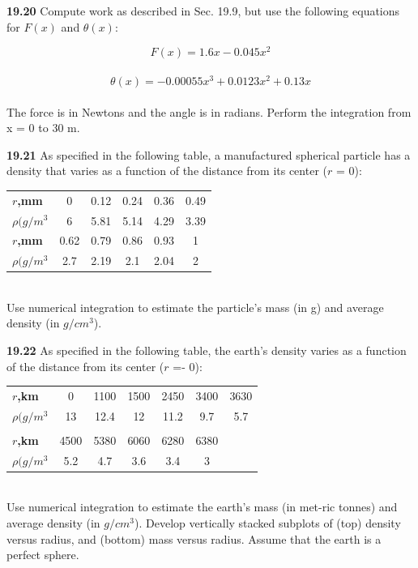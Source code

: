 \documentclass[../main.tex]{subfiles}
\begin{document}
\begin{multicols}{2}
\textbf{19.20} Compute work as described in Sec. 19.9, but use the
following equations for $F(x)$ and $\theta(x)$:

	$$F(x)=1.6x-0.045x^{2}$$\\
	$$\theta(x)=-0.00055x^{3} + 0.0123x^{2} + 0.13x$$\\
The force is in Newtons and the angle is in radians. Perform
the integration from x = 0 to 30 m.

\textbf{19.21} As specified in the following table, a manufactured
spherical particle has a density that varies as a function of the
distance from its center ($r$ = 0):\\
\begin{tabular}{lccccc}
	\hline
	\scriptsize{\textbf{$r$,mm}} & \scriptsize{0} & \scriptsize{0.12} & \scriptsize{0.24} & \scriptsize{0.36} & \scriptsize{0.49}\\
	\scriptsize{\textbf{$\rho(g/m^{3}$}} & \scriptsize{6} & \scriptsize{5.81} & \scriptsize{5.14} & \scriptsize{4.29} & \scriptsize{3.39}
	\vspace{0in}\\
	\scriptsize{\textbf{$r$,mm}} & \scriptsize{0.62} & \scriptsize{0.79} & \scriptsize{0.86} & \scriptsize{0.93} & \scriptsize{1}\\
	\scriptsize{\textbf{$\rho(g/m^{3}$}} & \scriptsize{2.7} & \scriptsize{2.19} & \scriptsize{2.1} & \scriptsize{2.04} & \scriptsize{2}\\ 	\hline
\end{tabular}
\vspace{0.2in}\\
Use numerical integration to estimate the particle's mass
(in g) and average density (in $g/cm^3$).

\textbf{19.22} As specified in the following table, the earth's density
varies as a function of the distance from its center ($r$ =- 0):\\
\begin{tabular}{lcccccc}
	\hline
	\scriptsize{\textbf{$r$,km}} & \scriptsize{0} & \scriptsize{1100} & \scriptsize{1500} & \scriptsize{2450} & \scriptsize{3400} & \scriptsize{3630}\\
	\scriptsize{\textbf{$\rho(g/m^{3}$}} & \scriptsize{13} & \scriptsize{12.4} & \scriptsize{12} & \scriptsize{11.2} & \scriptsize{9.7} & \scriptsize{5.7}\\
	\vspace{0in}\\
	\scriptsize{\textbf{$r$,km}} & \scriptsize{4500} & \scriptsize{5380} & \scriptsize{6060} & \scriptsize{6280} & \scriptsize{6380}\\
	\scriptsize{\textbf{$\rho(g/m^{3}$}} & \scriptsize{5.2} & \scriptsize{4.7} & \scriptsize{3.6} & \scriptsize{3.4} & \scriptsize{3}\\
	\hline
\end{tabular}
\vspace{0.2in}\\
Use numerical integration to estimate the earth's mass (in met-ric tonnes) and average density (in $g/cm^3$). Develop vertically stacked subplots of (top) density versus radius, and (bottom) mass versus radius. Assume that the earth is a perfect sphere.
	



\end{multicols}
\end{document}

